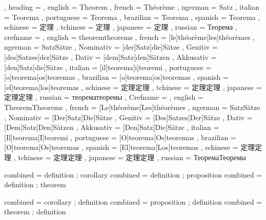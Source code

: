   {
    , heading =   {
                    , english     = Theorem
                    , french      = Théorème
                    , ngerman     = Satz
                    , italian     = Teorema
                    , portuguese  = Teorema
                    , brazilian   = Teorema
                    , spanish     = Teorema
                    , schinese    = 定理
                    , tchinese    = 定理
                    , japanese    = 定理
                    , russian     = Теорема
                  }
    , crefname =  {
                    , english     = {theorem}{theorems}
                    , french      = [le]{théorème}[les]{théorèmes}
                    , ngerman     = { {Satz}{Sätze}
                                      , Nominativ = [der]{Satz}[die]{Sätze}
                                      , Genitiv   = [des]{Satzes}[der]{Sätze}
                                      , Dativ     = [dem]{Satz}[den]{Sätzen}
                                      , Akkusativ = [den]{Satz}[die]{Sätze}
                                    }
                    , italian     = [il]{teorema}[i]{teoremi}
                    , portuguese  = [o]{teorema}[os]{teoremas}
                    , brazilian   = [o]{teorema}[os]{teoremas}
                    , spanish     = [el]{teorema}[los]{teoremas}
                    , schinese    = {定理}{定理}
                    , tchinese    = {定理}{定理}
                    , japanese    = {定理}{定理}
                    , russian     = {теорема}{теоремы}
                  }
    , Crefname =  {
                    , english     = {Theorem}{Theorems}
                    , french      = [Le]{théorème}[Les]{théorèmes}
                    , ngerman     = { {Satz}{Sätze}
                                      , Nominativ = [Der]{Satz}[Die]{Sätze}
                                      , Genitiv   = [Des]{Satzes}[Der]{Sätze}
                                      , Dativ     = [Dem]{Satz}[Den]{Sätzen}
                                      , Akkusativ = [Den]{Satz}[Die]{Sätze}
                                    }
                    , italian     = [Il]{teorema}[I]{teoremi}
                    , portuguese  = [O]{teorema}[Os]{teoremas}
                    , brazilian   = [O]{teorema}[Os]{teoremas}
                    , spanish     = [El]{teorema}[Los]{teoremas}
                    , schinese    = {定理}{定理}
                    , tchinese    = {定理}{定理}
                    , japanese    = {定理}{定理}
                    , russian     = {Теорема}{Теоремы}
                  }
  }

 { combined = { definition ; corollary } }
 { combined = { definition ; proposition } }
 { combined = { definition ; theorem } }

 { combined = { corollary ; definition } }
 { combined = { proposition ; definition } }
 { combined = { theorem ; definition } }
